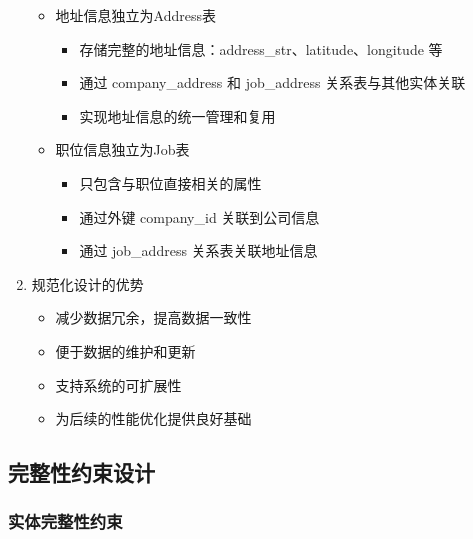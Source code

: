 \begin{enumerate}
\begin{itemize}
    \item 地址信息独立为Address表
    \begin{itemize}
      \item 存储完整的地址信息：address\_str、latitude、longitude 等
      \item 通过 company\_address 和 job\_address 关系表与其他实体关联
      \item 实现地址信息的统一管理和复用
    \end{itemize}

    \item 职位信息独立为Job表
    \begin{itemize}
      \item 只包含与职位直接相关的属性
      \item 通过外键 company\_id 关联到公司信息
      \item 通过 job\_address 关系表关联地址信息
    \end{itemize}
  \end{itemize}

  \item 规范化设计的优势
  \begin{itemize}
    \item 减少数据冗余，提高数据一致性
    \item 便于数据的维护和更新
    \item 支持系统的可扩展性
    \item 为后续的性能优化提供良好基础
  \end{itemize}
\end{enumerate}

\subsection{完整性约束设计}

\subsubsection{实体完整性约束}

